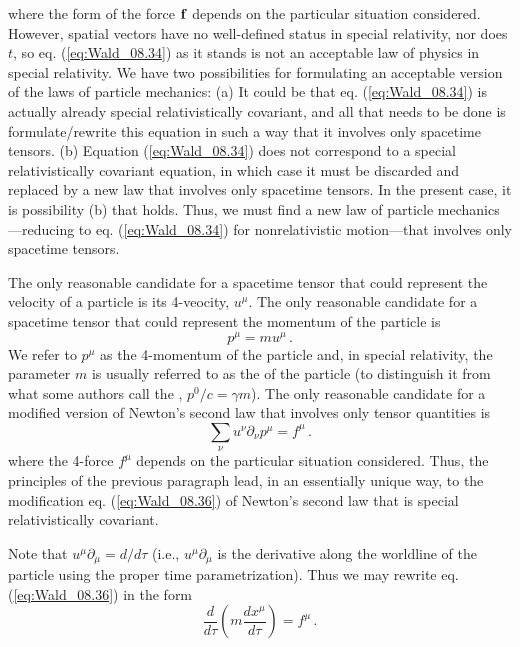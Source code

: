 where the form of the force $\vb{f}$ depends on the particular situation considered. However, spatial vectors have no well-defined status in special relativity, nor does $t$, so eq. (\ref{eq:Wald_08.34}) as it stands is not an acceptable law of physics in special relativity. We have two possibilities for formulating an acceptable version of the laws of particle mechanics: (a) It could be that eq. (\ref{eq:Wald_08.34}) is actually already special relativistically covariant, and all that needs to be done is formulate/rewrite this equation in such a way that it involves only spacetime tensors. (b) Equation (\ref{eq:Wald_08.34}) does not correspond to a special relativistically covariant equation, in which case it must be discarded and replaced by a new law that involves only spacetime tensors. In the present case, it is possibility (b) that holds. Thus, we must find a new law of particle mechanics---reducing to eq. (\ref{eq:Wald_08.34}) for nonrelativistic motion---that involves only spacetime tensors. 

The only reasonable candidate for a spacetime tensor that could represent the velocity of a particle is its 4-veocity, $u^\mu$. The only reasonable candidate for a spacetime tensor that could represent the momentum of the particle is 
\begin{equation}\label{eq:Wald_08.35}
p^\mu = m u^\mu\,.
\end{equation}
We refer to $p^\mu$ as the 4-momentum of the particle and, in special relativity, the parameter $m$ is usually referred to as the  of the particle (to distinguish it from what some authors call the , $p^0/c = \gamma m$). The only reasonable candidate for a modified version of Newton's second law that involves only tensor quantities is 
\begin{equation}\label{eq:Wald_08.36}
\sum_\nu u^\nu \partial_\nu p^\mu = f^\mu\,.
\end{equation}
where the 4-force $f^\mu$ depends on the particular situation considered. Thus, the principles of the previous paragraph lead, in an essentially unique way, to the modification eq. (\ref{eq:Wald_08.36}) of Newton's second law that is special relativistically covariant. 

Note that $u^\mu \partial_\mu = d/d\tau$ (i.e., $u^\mu \partial_\mu$ is the derivative along the worldline of the particle using the proper time parametrization). Thus we may rewrite eq. (\ref{eq:Wald_08.36}) in the form
\begin{equation}\label{eq:Wald_08.37}
\frac{d}{d\tau} \left(m \frac{d x^\mu}{d \tau} \right) = f^\mu\,.
\end{equation}

